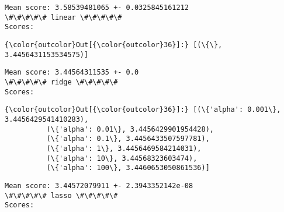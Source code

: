 \documentclass[11pt]{article}
\begin{document}
    \begin{Verbatim}[commandchars=\\\{\}]
Mean score: 3.58539481065 +- 0.0325845161212
\#\#\#\#\# linear \#\#\#\#\#
Scores:

    \end{Verbatim}

            \begin{Verbatim}[commandchars=\\\{\}]
{\color{outcolor}Out[{\color{outcolor}36}]:} [(\{\}, 3.4456431153534575)]
\end{Verbatim}
        
    \begin{Verbatim}[commandchars=\\\{\}]
Mean score: 3.44564311535 +- 0.0
\#\#\#\#\# ridge \#\#\#\#\#
Scores:

    \end{Verbatim}

            \begin{Verbatim}[commandchars=\\\{\}]
{\color{outcolor}Out[{\color{outcolor}36}]:} [(\{'alpha': 0.001\}, 3.4456429541410283),
          (\{'alpha': 0.01\}, 3.4456429901954428),
          (\{'alpha': 0.1\}, 3.4456433507597781),
          (\{'alpha': 1\}, 3.4456469584214031),
          (\{'alpha': 10\}, 3.44568323603474),
          (\{'alpha': 100\}, 3.4460653050861536)]
\end{Verbatim}
        
    \begin{Verbatim}[commandchars=\\\{\}]
Mean score: 3.44572079911 +- 2.3943352142e-08
\#\#\#\#\# lasso \#\#\#\#\#
Scores:

    \end{Verbatim}
\end{document}

